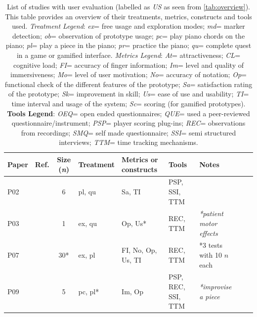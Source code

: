 \documentclass[sigconf, screen, review]{acmart}
\begin{document}
\begin{table}[t]
\caption{List of studies with user evaluation (labelled as \textit{US} as seen from \autoref{tab:overview}). This table provides an overview of their treatments, metrics, constructs and tools used. \textit{Treatment Legend}: \textit{ex}= free usage and exploration modes; \textit{md}= marker detection; \textit{ob}= observation of prototype usage; \textit{pc}= play piano chords on the piano;  \textit{pl}= play a piece in the piano; \textit{pr}= practice the piano; \textit{qu}= complete quest in a game or gamified interface.  \textit{Metrics Legend}:   \textit{At}= attractiveness; \textit{CL}= cognitive load; \textit{FI}= accuracy of finger information; \textit{Im}= level and quality of immersiveness; \textit{Mo}= level of user motivation; \textit{No}= accuracy of notation; \textit{Op}= functional check of the different features of the prototype; \textit{Sa}= satisfaction rating of the prototype; \textit{Sk}= improvement in skill; \textit{Us}= ease of use and usability; \textit{TI}= time interval and usage of the system; \textit{Sc}= scoring (for gamified prototypes). \textbf{Tools Legend}: \textit{OEQ}= open ended questionnaires; \textit{QUE}= used a peer-reviewed questionnaire/instrument; \textit{PSP}= player scoring plug-ins; \textit{REC}= observations from recordings; \textit{SMQ}= self made questionnaire; \textit{SSI}= semi structured interviews; \textit{TTM}= time tracking mechanisms. }
\label{tab:us-all}
\small\begin{tabularx}{\textwidth}{llclllllX} \toprule
\textbf{Paper} & \textbf{Ref.} & \textbf{Size} (\textit{n})    & \textbf{Treatment}    & \textbf{Metrics or constructs}    & \textbf{Tools} & \textbf{Notes }\\ \midrule
P02 &\cite{schmalstieg2007experiences}    & 6            & pl, qu      & Sa, TI                 & PSP, SSI, TTM         & \\ \hline 
P03 &\cite{correa2009computer}            & 1            & ex, qu      & Op, Us*                & REC, TTM              & \textit{*patient motor effects} \\ \hline 
P07 &\cite{mcpherson2011multidimensional} & 30*           & ex, pl      & FI, No, Op, Us, TI     & REC, TTM              & *3 tests with 10 $n$ each  \\ \hline
P09 &\cite{xiao2010mirrorfugue}           & 5            & pc, pl*     & Im, Op                 & PSP, REC, SSI, TTM    & \textit{*improvise a piece}\\ \hline

\end{tabularx}
\end{table}
\end{document}
